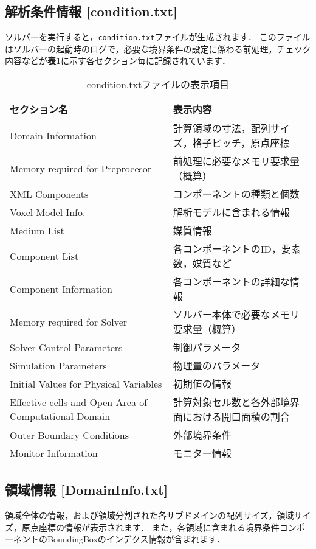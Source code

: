 %
\pagebreak
\subsection{解析条件情報 [condition.txt]}

ソルバーを実行すると，\verb|condition.txt|ファイルが生成されます．
このファイルはソルバーの起動時のログで，必要な境界条件の設定に係わる前処理，チェック内容などが\textbf{表\ref{tbl:log-section}}に示す各セクション毎に記録されています．

\begin{table}[htdp]
\caption{condition.txtファイルの表示項目}
\begin{center}
\small
\begin{tabular}{ll}\toprule
セクション名 & 表示内容\\ \midrule
Domain Information & 計算領域の寸法，配列サイズ，格子ピッチ，原点座標\\
Memory required for Preprocesor & 前処理に必要なメモリ要求量（概算）\\
XML Components & コンポーネントの種類と個数\\
Voxel Model Info. & 解析モデルに含まれる情報\\
Medium List & 媒質情報\\
Component List & 各コンポーネントのID，要素数，媒質など\\
Component Information & 各コンポーネントの詳細な情報\\
Memory required for Solver & ソルバー本体で必要なメモリ要求量（概算）\\
Solver Control Parameters & 制御パラメータ\\
Simulation Parameters & 物理量のパラメータ\\
Initial Values for Physical Variables & 初期値の情報\\
Effective cells and Open Area of Computational Domain& 計算対象セル数と各外部境界面における開口面積の割合\\
Outer Boundary Conditions & 外部境界条件\\ 
Monitor Information & モニター情報\\ \bottomrule
\end{tabular}
\end{center}
\label{tbl:log-section}
\end{table}


%
\pagebreak
\subsection{領域情報 [DomainInfo.txt]}
領域全体の情報，および領域分割された各サブドメインの配列サイズ，領域サイズ，原点座標の情報が表示されます．
また，各領域に含まれる境界条件コンポーネントのBoundingBoxのインデクス情報が含まれます．

